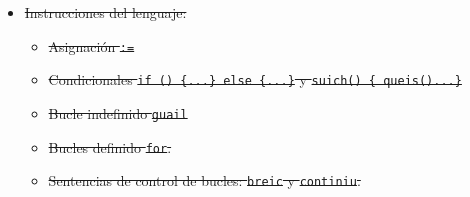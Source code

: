 \documentclass[10pt,a4paper]{article}
\begin{document}
\begin{itemize}
    \item \sout{Instrucciones del lenguaje:}
    \begin{itemize}
        \item \sout{Asignación \texttt{:=}}
        \item \sout{Condicionales \texttt{if () \{...\} else \{...\}} y \texttt{suich() \{ queis()...\}}}
        \item \sout{Bucle indefinido \texttt{guail}}
        \item \sout{Bucles definido \texttt{for}.}
        \item \sout{Sentencias de control de bucles: \texttt{breic} y \texttt{continiu}.}
    \end{itemize}
\end{itemize}
\end{document}
